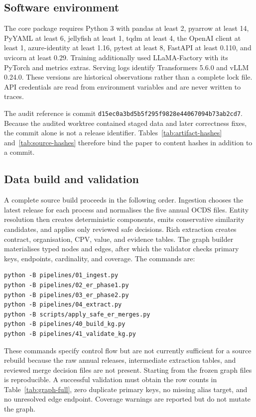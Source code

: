 \documentclass{article}
\begin{document}
\subsection{Software environment}

The core package requires Python 3 with pandas at least 2, pyarrow at least 14, PyYAML at least 6,
jellyfish at least 1, tqdm at least 4, the OpenAI client at least 1, azure-identity at least 1.16,
pytest at least 8, FastAPI at least 0.110, and uvicorn at least 0.29.  Training additionally used
LLaMA-Factory with its PyTorch and metrics extras.  Serving logs identify Transformers 5.6.0 and
vLLM 0.24.0.  These versions are historical observations rather than a complete lock file.  API
credentials are read from environment variables and are never written to traces.

The audit reference is commit \nolinkurl{d15ec0a3bd5b5f295f9828e44067094b73ab2cd7}.  Because the
audited worktree contained staged data and later correctness fixes, the commit alone is not a release
identifier.  Tables~\ref{tab:artifact-hashes} and~\ref{tab:source-hashes} therefore bind the paper to
content hashes in addition to a commit.

\subsection{Data build and validation}

A complete source build proceeds in the following order.  Ingestion chooses the latest release for
each process and normalises the five annual OCDS files.  Entity resolution then creates deterministic
components, emits conservative similarity candidates, and applies only reviewed safe decisions.
Rich extraction creates contract, organisation, CPV, value, and evidence tables.  The graph builder
materialises typed nodes and edges, after which the validator checks primary keys, endpoints,
cardinality, and coverage.  The commands are:

\begin{verbatim}
python -B pipelines/01_ingest.py
python -B pipelines/02_er_phase1.py
python -B pipelines/03_er_phase2.py
python -B pipelines/04_extract.py
python -B scripts/apply_safe_er_merges.py
python -B pipelines/40_build_kg.py
python -B pipelines/41_validate_kg.py
\end{verbatim}

These commands specify control flow but are not currently sufficient for a source rebuild because
the raw annual releases, intermediate extraction tables, and reviewed merge decision files are not
present.  Starting from the frozen graph files is reproducible.  A successful validation must obtain
the row counts in Table~\ref{tab:graph-full}, zero duplicate primary keys, no missing alias target,
and no unresolved edge endpoint.  Coverage warnings are reported but do not mutate the graph.
\end{document}
